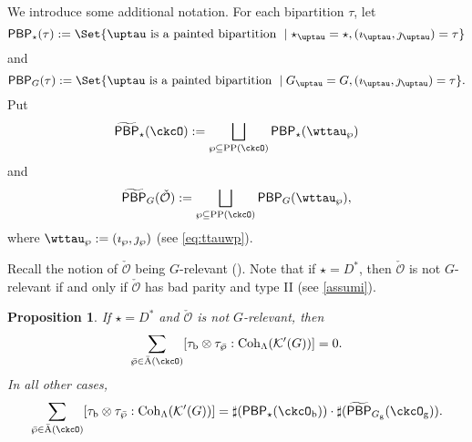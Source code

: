 \documentclass[12pt]{amsart}
\newcommand{\CK}{{\mathcal {K}}}
\newcommand{\CO}{{\mathcal {O}}}
\numberwithin{equation}{section}
\newtheorem{prop}[thm]{Proposition}
\theoremstyle{remark}
\def\Unip{\mathrm{Unip}}
\def\LC{{}^{\scriptscriptstyle L}\sC}
\def\Coh{\mathrm{Coh}}
\def\CPP{\mathrm{PP}}
\def\tPBP{\widetilde{\mathsf{PBP}}}
\def\PBP{\mathsf{PBP}}
\def\ckcOg{\ckcO_{\mathrm g}}
\def\nnb{n_{\mathrm b}}
\def\tPBP{\widetilde{\mathsf{PBP}}}
\begin{document}
 We introduce some additional notation. For each bipartition $\tau$, let
\[
  \PBP_{\star}(\tau) := \Set{ \uptau \text{ is a painted bipartition }\mid  \star_{\uptau}=\star, (\imath_{\uptau},\jmath_{\uptau}) = \tau}
\]
and
\[
  \PBP_{G}(\tau) := \Set{\uptau \text{ is a painted bipartition }\mid G_{\uptau}=G, (\imath_{\uptau},\jmath_{\uptau}) = \tau}.
\]
Put
\[
  \tPBP_{\star}(\ckcO) := %
  \bigsqcup_{\wp \subseteq \CPP(\ckcO)}\PBP_{\star}(\wttau_{\wp})
\]
and
\[
  \tPBP_{G}(\check \CO):=   \bigsqcup_{\wp \subseteq \CPP(\ckcO)}\PBP_{G}(\wttau_{\wp}),
 \]
where $\wttau_{\wp} := (\imath_{\wp},\jmath_{\wp})$ (see \eqref{eq:ttauwp}).



Recall the notion of $\check \CO$ being $G$-relevant (). Note that if  $\star =D^{*}$, then $\check \CO$ is not $G$-relevant if and only if $\check \CO$ has bad parity and type II (see \eqref{assumi}).

\begin{prop}\label{prop:countBCD}
 If  $\star =D^{*}$ and $\check \CO$ is not $G$-relevant, then
  \[
  \sum_{\bar \wp\in \bar{\mathrm A}(\ckcO)} [\tau_{\mathrm b}\otimes \tau_{\bar \wp}: \Coh_{\Lambda} (\CK'(G))]=0.
  \]
In all other cases,   %
 \[
 \sum_{\bar \wp\in \bar{\mathrm A}(\ckcO)} [\tau_{\mathrm b}\otimes \tau_{\bar \wp}: \Coh_{\Lambda} (\CK'(G))]=
           \sharp (\PBP_{\star}(\ckcO_{\mathrm b}))\cdot \sharp(\tPBP_{G_{\mathrm g}}(\ckcO_{\mathrm g})).
           \]
 \end{prop}
\end{document}
